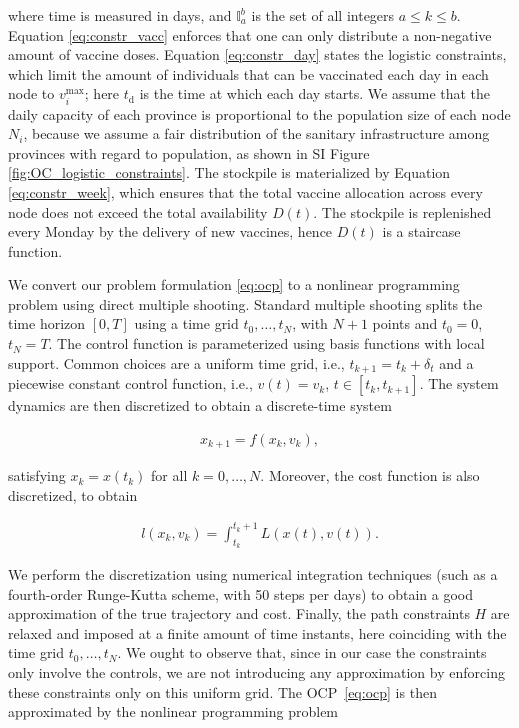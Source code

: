 where time is measured in days, and $\mathbb{I}_a^b$ is the set of all integers $a\leq k\leq b$. Equation \eqref{eq:constr_vacc} enforces that one can only distribute a non-negative amount of vaccine doses. Equation \eqref{eq:constr_day} states the logistic constraints, which limit the amount of individuals that can be vaccinated each day in each node to $v_i^\mathrm{max}$; here $t_\mathrm{d}$ is the time at which each day starts. We assume that the daily capacity of each province is proportional to the population size of each node $N_i$, because we assume a fair distribution of the sanitary infrastructure among provinces with regard to population, as shown in SI Figure \ref{fig:OC_logistic_constraints}. The stockpile is materialized by Equation
\eqref{eq:constr_week}, which ensures that the total vaccine allocation across every node does not exceed the total availability $D(t)$. The stockpile is replenished every Monday by the delivery of new vaccines, hence $D(t)$ is a staircase function.

We convert our problem formulation \eqref{eq:ocp} to a nonlinear programming problem using direct multiple shooting. Standard multiple shooting splits the time horizon $[0,T]$ using a time grid $t_0,\ldots,t_N$, with $N+1$ points and $t_0=0$, $t_N=T$. 
The control function is parameterized using basis functions with local support. Common choices are a uniform time grid, i.e., $t_{k+1}=t_k+\delta_t$ and a piecewise constant control function, i.e., $v(t)=v_k$, $t\in [t_k,t_{k+1}]$. The system dynamics are then discretized to obtain a discrete-time system

\begin{align*}
    x_{k+1} = f(x_k,v_k),
\end{align*}

satisfying $x_k=x(t_k)$ for all $k=0,\ldots,N$. Moreover, the cost function is also discretized, to obtain

\begin{align*}
    l(x_k,v_k)=\int_{t_k}^{t_k+1} L(x(t),v(t)).
\end{align*}

We perform the discretization using numerical integration techniques (such as a fourth-order Runge-Kutta scheme, with 50 steps per days) to obtain a good approximation of the true trajectory and cost. Finally, the path constraints $H$ are relaxed and imposed at a finite amount of time instants, here coinciding with the time grid $t_0,\ldots,t_N$. We ought to observe that, since in our case the constraints only involve the controls, we are not introducing any approximation by enforcing these constraints only on this uniform grid. The OCP~\eqref{eq:ocp} is then approximated by the nonlinear programming problem

